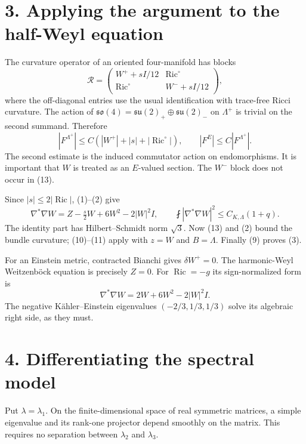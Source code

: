 \documentclass[
  11pt,
]{article}
\begin{document}
\hypertarget{applying-the-argument-to-the-half-weyl-equation}{%
\section{3. Applying the argument to the half-Weyl
equation}\label{applying-the-argument-to-the-half-weyl-equation}}

The curvature operator of an oriented four-manifold has blocks \[
 \mathcal R=
 \begin{pmatrix}
 W^++sI/12&\operatorname{Ric}^{\circ}\\
 \operatorname{Ric}^{\circ}&W^-+sI/12
 \end{pmatrix},
 \tag{12}
\] where the off-diagonal entries use the usual identification with
trace-free Ricci curvature. The action of
\(\mathfrak{so}(4)=\mathfrak{su}(2)_+\oplus\mathfrak{su}(2)_-\) on
\(\Lambda^+\) is trivial on the second summand. Therefore \[
 |F^{\Lambda^+}|\le C(|W^+|+|s|+|\operatorname{Ric}^{\circ}|),
 \qquad |F^E|\le C|F^{\Lambda^+}|.
 \tag{13}
\] The second estimate is the induced commutator action on
endomorphisms. It is important that \(W\) is treated as an \(E\)-valued
section. The \(W^-\) block does not occur in (13).

Since \(|s|\le2|\operatorname{Ric}|\), (1)--(2) give \[
 \nabla^*\nabla W
       =Z-\tfrac{s}{2}W+6W^2-2|W|^2I,
 \qquad
 \fint|\nabla^*\nabla W|^2\le C_{K,\Lambda}(1+q).
 \tag{14}
\] The identity part has Hilbert--Schmidt norm \(\sqrt3\). Now (13) and
(2) bound the bundle curvature; (10)--(11) apply with \(z=W\) and
\(B=\Lambda\). Finally (9) proves (3).

For an Einstein metric, contracted Bianchi gives \(\delta W^+=0\). The
harmonic-Weyl Weitzenböck equation is precisely \(Z=0\). For
\(\operatorname{Ric}=-g\) its sign-normalized form is \[
       \nabla^*\nabla W=2W+6W^2-2|W|^2I.
 \tag{15}
\] The negative Kähler--Einstein eigenvalues \((-2/3,1/3,1/3)\) solve
its algebraic right side, as they must.

\hypertarget{differentiating-the-spectral-model}{%
\section{4. Differentiating the spectral
model}\label{differentiating-the-spectral-model}}

Put \(\lambda=\lambda_1\). On the finite-dimensional space of real
symmetric matrices, a simple eigenvalue and its rank-one projector
depend smoothly on the matrix. This requires no separation between
\(\lambda_2\) and \(\lambda_3\).
\end{document}
